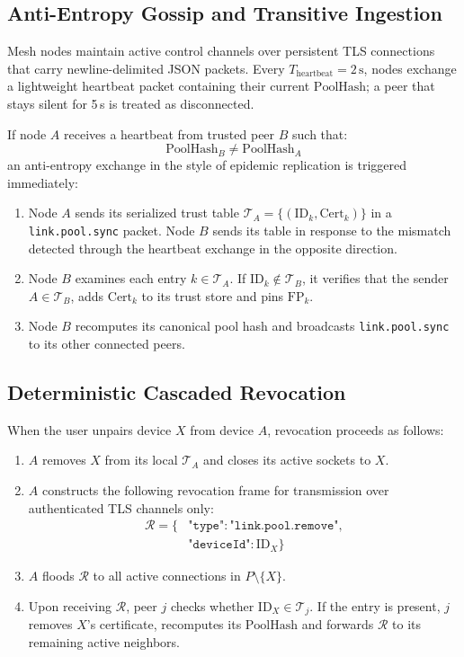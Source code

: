\documentclass[conference,a4paper]{IEEEtran}
\begin{document}
\subsection{Anti-Entropy Gossip and Transitive Ingestion}
Mesh nodes maintain active control channels over persistent TLS connections that carry newline-delimited JSON packets. Every $T_{\text{heartbeat}} = 2\,\text{s}$, nodes exchange a lightweight heartbeat packet containing their current $\text{PoolHash}$; a peer that stays silent for 5\,s is treated as disconnected.

If node $A$ receives a heartbeat from trusted peer $B$ such that:
\begin{equation}
    \text{PoolHash}_B \neq \text{PoolHash}_A
\end{equation}
an anti-entropy exchange in the style of epidemic replication \cite{demers1987epidemic} is triggered immediately:
\begin{enumerate}
    \item Node $A$ sends its serialized trust table $\mathcal{T}_A = \{ (\text{ID}_k, \text{Cert}_k) \}$ in a \texttt{link.pool.sync} packet. Node $B$ sends its table in response to the mismatch detected through the heartbeat exchange in the opposite direction.
    \item Node $B$ examines each entry $k \in \mathcal{T}_A$. If $\text{ID}_k \notin \mathcal{T}_B$, it verifies that the sender $A \in \mathcal{T}_B$, adds $\text{Cert}_k$ to its trust store and pins $\text{FP}_k$.
    \item Node $B$ recomputes its canonical pool hash and broadcasts \texttt{link.pool.sync} to its other connected peers.
\end{enumerate}

\subsection{Deterministic Cascaded Revocation}
When the user unpairs device $X$ from device $A$, revocation proceeds as follows:
\begin{enumerate}
    \item $A$ removes $X$ from its local $\mathcal{T}_A$ and closes its active sockets to $X$.
    \item $A$ constructs the following revocation frame for transmission over authenticated TLS channels only:
    \begin{equation}
    \begin{split}
        \mathcal{R} = \big\{&\texttt{"type"}: \texttt{"link.pool.remove"}, \\
        &\texttt{"deviceId"}: \text{ID}_X\big\}
    \end{split}
    \end{equation}
    \item $A$ floods $\mathcal{R}$ to all active connections in $P \setminus \{X\}$.
    \item Upon receiving $\mathcal{R}$, peer $j$ checks whether $\text{ID}_X \in \mathcal{T}_j$. If the entry is present, $j$ removes $X$'s certificate, recomputes its $\text{PoolHash}$ and forwards $\mathcal{R}$ to its remaining active neighbors.
\end{enumerate}
\end{document}
